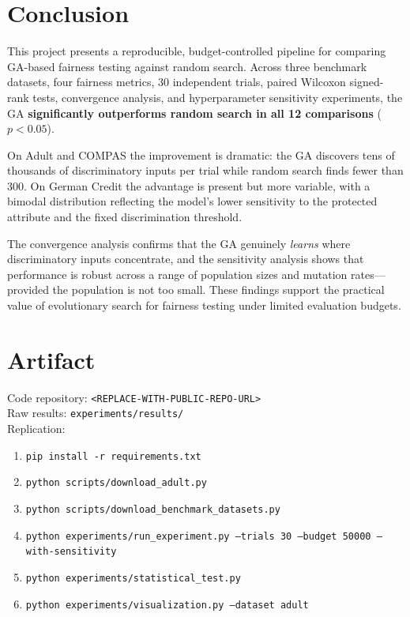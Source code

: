 \documentclass[10pt]{article}
\begin{document}
\section{Conclusion}

This project presents a reproducible, budget-controlled pipeline for comparing
GA-based fairness testing against random search.  Across three benchmark datasets, four
fairness metrics, 30 independent trials, paired Wilcoxon signed-rank tests, convergence
analysis, and hyperparameter sensitivity experiments, the GA \textbf{significantly
outperforms random search in all 12 comparisons} ($p < 0.05$).

On Adult and COMPAS the improvement is dramatic: the GA discovers tens of thousands of
discriminatory inputs per trial while random search finds fewer than 300.  On German
Credit the advantage is present but more variable, with a bimodal distribution reflecting
the model's lower sensitivity to the protected attribute and the fixed discrimination
threshold.

The convergence analysis confirms that the GA genuinely \emph{learns} where
discriminatory inputs concentrate, and the sensitivity analysis shows that performance
is robust across a range of population sizes and mutation rates---provided the
population is not too small.  These findings support the practical value of
evolutionary search for fairness testing under limited evaluation budgets.

\section{Artifact}

Code repository: \texttt{<REPLACE-WITH-PUBLIC-REPO-URL>}\\
Raw results: \texttt{experiments/results/}\\
Replication:
\begin{enumerate}
    \item \texttt{pip install -r requirements.txt}
    \item \texttt{python scripts/download\_adult.py}
    \item \texttt{python scripts/download\_benchmark\_datasets.py}
    \item \texttt{python experiments/run\_experiment.py --trials 30 --budget 50000
          --with-sensitivity}
    \item \texttt{python experiments/statistical\_test.py}
    \item \texttt{python experiments/visualization.py --dataset adult}
\end{enumerate}
\end{document}
